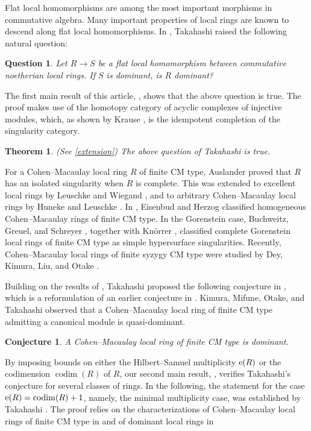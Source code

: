 \documentclass{amsart}
\newcommand{\0}{{\bf{0}}}
\DeclareMathOperator{\codim}{codim}
\newtheorem{theorem}{Theorem}[section]
\newtheorem*{Question}{Question}
\newtheorem*{Conjecture}{Conjecture}
\theoremstyle{definition}
\begin{document}
Flat local homomorphisms are among the most important morphisms in commutative algebra. Many important properties of local rings are known to descend along flat local homomorphisms. In \cite[Question 7.5]{Takahashi:2023}, Takahashi raised the following natural question:

\begin{Question}
    Let $R\longrightarrow S$ be a flat local homomorphism between commutative noetherian local rings. If $S$ is dominant, is $R$ dominant? 
\end{Question}


The first main result of this article, , shows that the above question is true. The proof makes use of the homotopy category of acyclic complexes of injective modules, which, as shown by Krause \cite{Krause2005}, is the idempotent completion of the singularity category.


\begin{theorem}\label{T1}
(See \ref{extension})  The above question of Takahashi is true. 
\end{theorem}


For a Cohen--Macaulay local ring $R$ of finite CM type, Auslander \cite{Auslander} proved that $R$ has an isolated singularity when $R$ is complete. This was extended to excellent local rings by Leuschke and Wiegand \cite{LW:2000}, and to arbitrary Cohen--Macaulay local rings by Huneke and Leuschke \cite{HL}. In \cite{EH}, Eisenbud and Herzog classified homogeneous Cohen--Macaulay rings of finite CM type. In the Gorenstein case, Buchweitz, Greuel, and Schreyer \cite{BGS}, together with Knörrer \cite{Knorrer}, classified complete Gorenstein local rings of finite CM type as simple hypersurface singularities. Recently, Cohen--Macaulay local rings of finite syzygy CM type were studied by Dey, Kimura, Liu, and Otake \cite{DKLO}.


Building on the results of \cite{Takahashi:2023}, Takahashi proposed the following conjecture in \cite[Conjecture 9.1]{Takahashi:2023}, which is a reformulation of an earlier conjecture in \cite[Conjecture 4.2]{Takahashi:2021}. Kimura, Mifune, Otake, and Takahashi \cite{KMOT} observed that a Cohen--Macaulay local ring of finite CM type admitting a canonical module is quasi-dominant.
\begin{Conjecture}
A Cohen--Macaulay local ring of finite CM type is dominant.
\end{Conjecture}



By imposing bounds on either the Hilbert--Samuel multiplicity ${\rm e}(R)$ or the codimension $\codim(R)$ of $R$, our second main result, , verifies Takahashi's conjecture for several classes of rings. In the following, the statement for the case ${\rm e}(R)=\codim(R)+1$, namely, the minimal multiplicity case, was established by Takahashi \cite{Takahashi:2023}. The proof relies on the characterizations of Cohen--Macaulay local rings of finite CM type in \cite{DKLO} and of dominant local rings in \cite{KT2026, Takahashi:2023}
\end{document}
